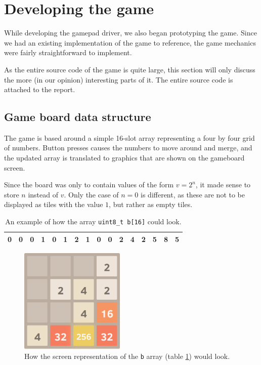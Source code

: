 \newpage
\section{Developing the game}
While developing the gamepad driver, we also began prototyping the game.
Since we had an existing implementation of the game \cite{2048} to reference,
the game mechanics were fairly straightforward to implement.

As the entire source code of the game is quite large, this section will only discuss the more (in our opinion) interesting parts of it.
The entire source code is attached to the report.

\subsection{Game board data structure\label{data_structure}}
The game is based around a simple 16-slot array representing a four by four grid of numbers.
Button presses causes the numbers to move around and merge,
and the updated array is translated to graphics that are shown on the gameboard screen.

Since the board was only to contain values of the form $v = 2^n$, it made sense to store $n$ instead of $v$. Only the case of $n = 0$ is different, as these are not to be displayed as tiles with the value $1$, but rather as empty tiles.

\begin{table}[h!]
    \centering
    \begin{tabular}{|l|l|l|l|l|l|l|l|l|l|l|l|l|l|l|l|}
        \hline
        0 & 0 & 0 & 1 & 0 & 1 & 2 & 1 & 0 & 0 & 2 & 4 & 2 & 5 & 8 & 5 \\ \hline
    \end{tabular}
    \caption{An example of how the array \texttt{uint8\_t b[16]} could look.}
    \label{array_b}
\end{table}

\begin{figure}[h!]
    \centering
    \includegraphics[width=5cm]{img/2048.png}
    \caption{How the screen representation of the \texttt{b} array (table \ref{array_b}) would look.}
\end{figure}

